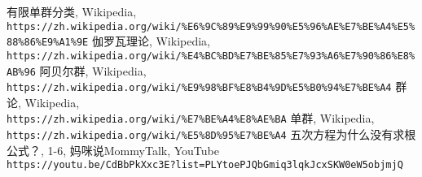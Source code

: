 \documentclass[hyperref,UTF8,12pt,a4paper]{ctexart}
\begin{document}
\begin{thebibliography}{99}
 有限单群分类, Wikipedia, \\
\texttt{https://zh.wikipedia.org/wiki/\%E6\%9C\%89\%E9\%99\%90\%E5\%96\%AE\%E7\%BE\%A4\%E5\%88\%86\%E9\%A1\%9E}
 伽罗瓦理论, Wikipedia, \\
\texttt{https://zh.wikipedia.org/wiki/\%E4\%BC\%BD\%E7\%BE\%85\%E7\%93\%A6\%E7\%90\%86\%E8\%AB\%96}
 阿贝尔群, Wikipedia, \\
\texttt{https://zh.wikipedia.org/wiki/\%E9\%98\%BF\%E8\%B4\%9D\%E5\%B0\%94\%E7\%BE\%A4}
 群论, Wikipedia, \\
\texttt{https://zh.wikipedia.org/wiki/\%E7\%BE\%A4\%E8\%AE\%BA}
 单群, Wikipedia, \\
\texttt{https://zh.wikipedia.org/wiki/\%E5\%8D\%95\%E7\%BE\%A4}
 五次方程为什么没有求根公式？, 1-6, 妈咪说MommyTalk, YouTube \\
\texttt{https://youtu.be/CdBbPkXxc3E?list=PLYtoePJQbGmiq3lqkJcxSKW0eW5objmjQ}

\end {thebibliography}
\end{document}
